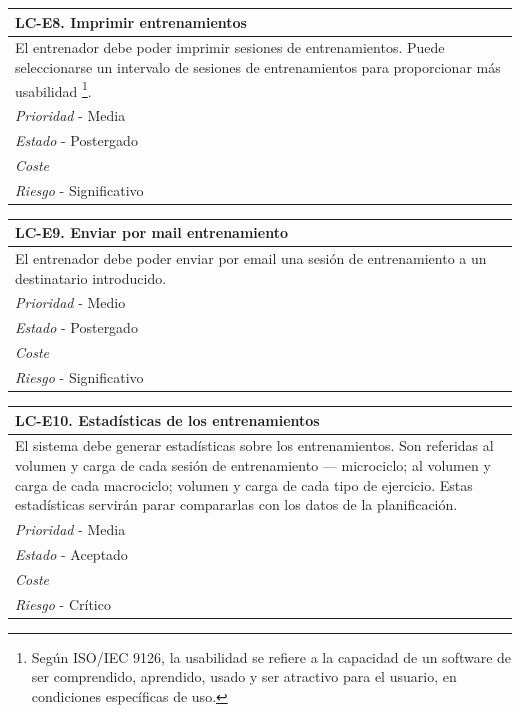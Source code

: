 	\begin{center}
		\begin{tabularx}{15cm}{|X|}
			\hline 
				\bf{LC-E8. Imprimir entrenamientos}\\
			\hline
				El entrenador debe poder imprimir sesiones de entrenamientos. Puede seleccionarse un intervalo de sesiones de entrenamientos para proporcionar más usabilidad \footnote{Según ISO/IEC 9126, la usabilidad se refiere a la capacidad de un software de ser comprendido, aprendido, usado y ser atractivo para el usuario, en condiciones específicas de uso.}.\\
			\hline
				{\it Prioridad} - Media\\
			\hline
				{\it Estado} - Postergado\\
			\hline
				{\it Coste}\\
			\hline
				{\it Riesgo} - Significativo\\
			\hline
		\end{tabularx}
	\end{center}
	
	\begin{center}
		\begin{tabularx}{15cm}{|X|}
			\hline 
				\bf{LC-E9. Enviar por mail entrenamiento }\\
			\hline
				El entrenador debe poder enviar por email una sesión de entrenamiento a un destinatario introducido.\\
			\hline
				{\it Prioridad} - Medio\\
			\hline
				{\it Estado} - Postergado\\
			\hline
				{\it Coste}\\
			\hline
				{\it Riesgo} - Significativo\\
			\hline
		\end{tabularx}
	\end{center}
	
	\begin{center}
		\begin{tabularx}{15cm}{|X|}
			\hline 
				\bf{LC-E10. Estadísticas de los entrenamientos}\\
			\hline
				El sistema debe generar estadísticas sobre los entrenamientos. Son referidas al volumen y carga de cada sesión de entrenamiento --- microciclo; al volumen y carga de cada macrociclo; volumen y carga de cada tipo de ejercicio. Estas estadísticas servirán parar compararlas con los datos de la planificación.\\
			\hline
				{\it Prioridad} - Media\\
			\hline
				{\it Estado} - Aceptado\\
			\hline
				{\it Coste}\\
			\hline
				{\it Riesgo} - Crítico\\
			\hline
		\end{tabularx}
	\end{center}
	
